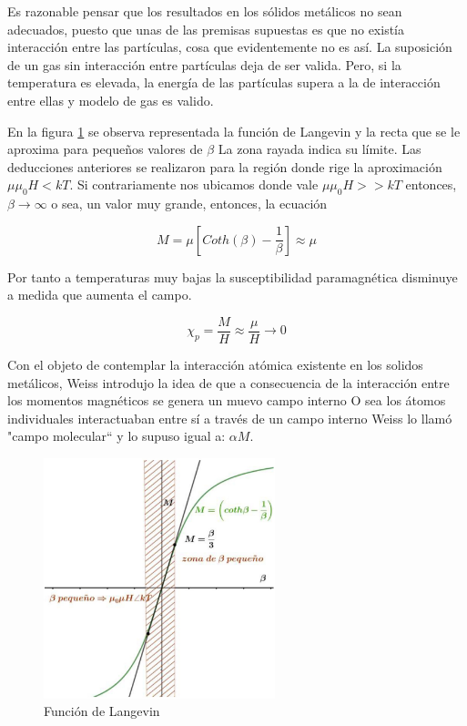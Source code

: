 Es razonable pensar que los resultados en los sólidos metálicos no sean adecuados, puesto que unas de las premisas supuestas es que no existía interacción entre las partículas, cosa que evidentemente no es así. La suposición de un gas sin interacción entre partículas deja de ser valida. Pero, si la temperatura es elevada, la energía de las partículas supera a la de interacción entre ellas y modelo de gas es valido.

En la figura \ref{fig:c2} se observa representada la función de Langevin y la recta que se le aproxima para pequeños valores de $\beta$ La zona rayada indica su límite. Las deducciones anteriores se realizaron para la región donde rige la aproximación $\mu\mu_{0}H < kT$. Si contrariamente nos ubicamos donde vale $\mu\mu_{0}H >> kT$ entonces, $\beta\rightarrow\infty$ o sea, un valor muy grande, entonces, la ecuación

\begin{equation*}
	M= \mu \left[ Coth(\beta)-\dfrac{1}{\beta} \right] \approx \mu
\end{equation*}

Por tanto a temperaturas muy bajas la susceptibilidad paramagnética disminuye a medida que aumenta el campo. 

\begin{equation}
	\chi_{p} = \dfrac{M}{H} \approx \dfrac{\mu}{H}\rightarrow 0
\end{equation}


Con el objeto de contemplar la interacción atómica existente en los solidos metálicos, Weiss introdujo la idea de que a consecuencia de la interacción entre los momentos magnéticos se genera un muevo campo interno O sea los átomos individuales interactuaban entre sí a través de un campo interno Weiss lo llamó "campo molecular“ y lo supuso igual a: $\alpha M$.


\begin{figure}[H]
    \centering
    \includegraphics[width=0.6\textwidth]{./Figures/fig_c2}
	\caption{Función de Langevin}
	\label{fig:c2}
\end{figure}

